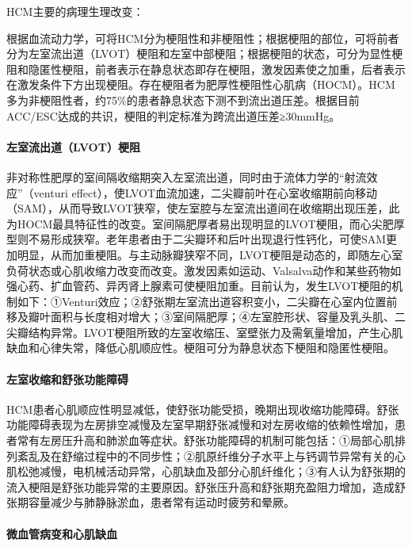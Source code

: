 HCM主要的病理生理改变：

根据血流动力学，可将HCM分为梗阻性和非梗阻性；根据梗阻的部位，可将前者分为左室流出道（LVOT）梗阻和左室中部梗阻；根据梗阻的状态，可分为显性梗阻和隐匿性梗阻，前者表示在静息状态即存在梗阻，激发因素使之加重，后者表示在激发条件下方出现梗阻。存在梗阻者为肥厚性梗阻性心肌病（HOCM）。HCM多为非梗阻性者，约75\%的患者静息状态下测不到流出道压差。根据目前ACC/ESC达成的共识，梗阻的判定标准为跨流出道压差≥30mmHg。

\paragraph{左室流出道（LVOT）梗阻}

非对称性肥厚的室间隔收缩期突入左室流出道，同时由于流体力学的“射流效应”（venturi
effect），使LVOT血流加速，二尖瓣前叶在心室收缩期前向移动（SAM），从而导致LVOT狭窄，使左室腔与左室流出道间在收缩期出现压差，此为HOCM最具特征性的改变。室间隔肥厚者易出现明显的LVOT梗阻，而心尖肥厚型则不易形成狭窄。老年患者由于二尖瓣环和后叶出现退行性钙化，可使SAM更加明显，从而加重梗阻。与主动脉瓣狭窄不同，LVOT梗阻是动态的，即随左心室负荷状态或心肌收缩力改变而改变。激发因素如运动、Valsalva动作和某些药物如强心药、扩血管药、异丙肾上腺素可使梗阻加重。目前认为，发生LVOT梗阻的机制如下：①Venturi效应；②舒张期左室流出道容积变小，二尖瓣在心室内位置前移及瓣叶面积与长度相对增大；③室间隔肥厚；④左室腔形状、容量及乳头肌、二尖瓣结构异常。LVOT梗阻所致的左室收缩压、室壁张力及需氧量增加，产生心肌缺血和心律失常，降低心肌顺应性。梗阻可分为静息状态下梗阻和隐匿性梗阻。

\paragraph{左室收缩和舒张功能障碍}

HCM患者心肌顺应性明显减低，使舒张功能受损，晚期出现收缩功能障碍。舒张功能障碍表现为左房排空减慢及左室早期舒张减慢和对左房收缩的依赖性增加，患者常有左房压升高和肺淤血等症状。舒张功能障碍的机制可能包括：①局部心肌排列紊乱及在舒缩过程中的不同步性；②肌原纤维分子水平上与钙调节异常有关的心肌松弛减慢，电机械活动异常，心肌缺血及部分心肌纤维化；③有人认为舒张期的流入梗阻是舒张功能异常的主要原因。舒张压升高和舒张期充盈阻力增加，造成舒张期容量减少与肺静脉淤血，患者常有运动时疲劳和晕厥。

\paragraph{微血管病变和心肌缺血}


